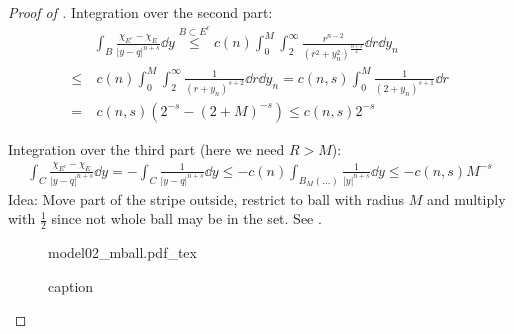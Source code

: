 \begin{proof}[Proof of ]
	Integration over the second part:
	\begin{align*}
		     & \int_B \frac{\chi_{E^c} - \chi_E}{\lvert y - q\rvert^{n + s}} \dd{y} \overset{B \subset E^c}{\leq} c(n) \int_0^M \int_2^\infty \frac{r^{n - 2}}{(r^2 + y_n^2)^{\frac{n + s}{2}}} \dd{r} \dd{y_n} \\
		\leq & \ c(n) \int_0^M \int_2^\infty \frac{1}{(r + y_n)^{s + 2}} \dd{r} \dd{y_n} = c(n, s) \int_0^M \frac{1}{(2 + y_n)^{s + 1}} \dd{r} \\
		=    & \ c(n, s)(2^{- s} - (2 + M)^{- s}) \leq c(n, s) 2^{- s}
	\end{align*}

	Integration over the third part (here we need \( R > M \)):
	\begin{align*}
		\int_C \frac{\chi_{E^c} - \chi_E}{\lvert y - q\rvert^{n + s}} \dd{y} = - \int_C \frac{1}{\lvert y - q \rvert^{n + s}} \dd{y} \leq - c(n) \int_{B_M (\ldots)} \frac{1}{\lvert y\rvert^{n + s}} \dd{y} \leq - c(n, s) M^{- s}
	\end{align*}
	Idea: Move part of the stripe outside, restrict to ball with radius \( M \) and
	multiply with \( \frac{1}{2} \) since not whole ball may be in the set. See .

	\begin{figure}[ht]
		\centering
		\def\svgscale{1}
		{model02_mball.pdf_tex}
		\caption{caption}
		\label{fig:107}
	\end{figure}



\end{proof}
